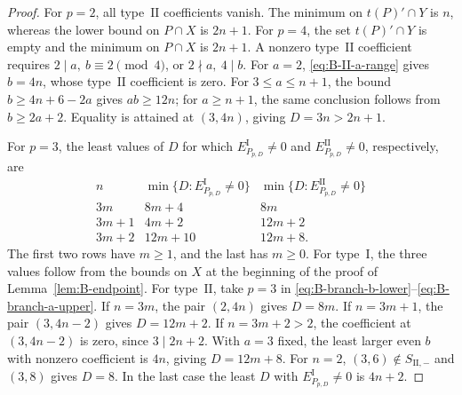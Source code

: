 \documentclass[11pt,a4paper]{amsart}
\theoremstyle{plain}
\numberwithin{equation}{section}
\newenvironment{pf}{\begin{proof}}{\end{proof}}
\begin{document}
\begin{pf}
	For \(p=2\), all type~\(\mathrm{II}\) coefficients vanish.
	The minimum on \(t(P)'\cap Y\) is \(n\), whereas the lower
	bound on \(P\cap X\) is \(2n+1\).
	For \(p=4\), the set \(t(P)'\cap Y\) is empty and the minimum
	on \(P\cap X\) is \(2n+1\). A nonzero type~\(\mathrm{II}\)
	coefficient requires \(2\mid a,\ b\equiv2\pmod4\), or
	\(2\nmid a,\ 4\mid b\). For \(a=2\), \eqref{eq:B-II-a-range} gives
	\(b=4n\), whose type~\(\mathrm{II}\) coefficient is zero.
	For \(3\le a\le n+1\), the bound \(b\ge4n+6-2a\) gives
	\(ab\ge12n\); for \(a\ge n+1\), the same conclusion follows
	from \(b\ge2a+2\). Equality is attained at \((3,4n)\), giving
	\(D=3n>2n+1\).
	
	For \(p=3\), the least values of \(D\) for which
	\(E_{P_{p,D}}^{\mathrm I}\ne0\) and
	\(E_{P_{p,D}}^{\mathrm{II}}\ne0\), respectively, are
	\[
	\begin{array}{c|c|c}
		n&\min\{D:E_{P_{p,D}}^{\mathrm I}\ne0\}&
		\min\{D:E_{P_{p,D}}^{\mathrm{II}}\ne0\}\\ \hline
		3m&8m+4&8m\\
		3m+1&4m+2&12m+2\\
		3m+2&12m+10&12m+8.
	\end{array}
	\]
	The first two rows have \(m\ge1\), and the last has \(m\ge0\).
	For type~\(\mathrm I\), the three values follow from the bounds
	on \(X\) at the beginning of the proof of Lemma~\ref{lem:B-endpoint}.
	For type~\(\mathrm{II}\), take \(p=3\) in
	\eqref{eq:B-branch-b-lower}--\eqref{eq:B-branch-a-upper}.
	If \(n=3m\), the pair \((2,4n)\) gives \(D=8m\).
	If \(n=3m+1\), the pair \((3,4n-2)\) gives \(D=12m+2\).
	If \(n=3m+2>2\), the coefficient at \((3,4n-2)\) is zero,
	since \(3\mid2n+2\). With \(a=3\) fixed, the least larger
	even \(b\) with nonzero coefficient is \(4n\), giving
	\(D=12m+8\). For \(n=2\), \((3,6)\notin S_{\mathrm{II},-}\)
	and \((3,8)\) gives \(D=8\). In the last case the least
	\(D\) with \(E_{P_{p,D}}^{\mathrm I}\ne0\) is \(4n+2\).
	

\end{pf}
\end{document}
